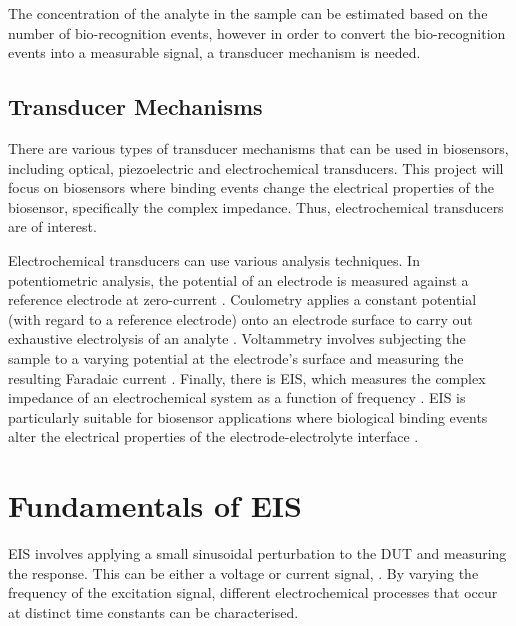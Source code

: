 The concentration of the analyte in the sample can be estimated based on the number of bio-recognition events, however in order to convert the bio-recognition events into a measurable signal, a transducer mechanism is needed\cite{bhallaIntroductionBiosensors2016}. 

\subsection{Transducer Mechanisms}
There are various types of transducer mechanisms that can be used in biosensors, including optical, piezoelectric and electrochemical transducers. This project will focus on biosensors where binding events change the electrical properties of the biosensor, specifically the complex impedance. Thus, electrochemical transducers are of interest. 

Electrochemical transducers can use various analysis techniques. In potentiometric analysis, the potential of an electrode is measured against a reference electrode at zero-current \cite{magarElectrochemicalImpedanceSpectroscopy2021}. Coulometry applies a constant potential (with regard to a reference electrode) onto an electrode surface to carry out exhaustive electrolysis of an analyte \cite{magarElectrochemicalImpedanceSpectroscopy2021}. Voltammetry involves subjecting the sample to a varying potential at the electrode's surface and measuring the resulting Faradaic current \cite{magarElectrochemicalImpedanceSpectroscopy2021}. Finally, there is \ac{EIS}, which measures the complex impedance of an electrochemical system as a function of frequency \cite{magarElectrochemicalImpedanceSpectroscopy2021}. \Ac{EIS} is particularly suitable for biosensor applications where biological binding events alter the electrical properties of the electrode-electrolyte interface \cite{danielsLabelFreeImpedanceBiosensors2007}. 

\section{Fundamentals of EIS}
EIS involves applying a small sinusoidal perturbation to the \ac{DUT} and measuring the response. This can be either a voltage or current signal, . By varying the frequency of the excitation signal, different electrochemical processes that occur at distinct time constants can be characterised.

